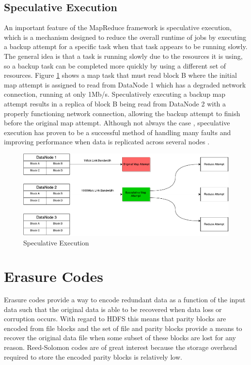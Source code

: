 \documentclass{ucetd}
\begin{document}
    \subsection{Speculative Execution}

An important feature of the MapReduce framework is speculative execution, which
is a mechanism designed to reduce the overall runtime of jobs by executing a
backup attempt for a specific task when that task appears to be running slowly.
The general idea is that a task is running slowly due to the resources it is
using, so a backup task can be completed more quickly by using a different set
of resources.  Figure \ref{specExec} shows a map task that must read block B
where the initial map attempt is assigned to read from DataNode 1 which has a
degraded network connection, running at only 1Mb/s. Speculatively executing a
backup map attempt results in a replica of block B being read from DataNode 2
with a properly functioning network connection, allowing the backup attempt to
finish before the original map attempt. Although
not always the case \cite{Do}, speculative execution has proven to be a
successful method of handling many faults and improving performance when data is
replicated across several nodes \cite{Dean:SpecExec}.

\begin{figure}
    \centering
    \includegraphics[width=\textwidth]{diagrams/SpeculativeExecution.pdf}
    \caption{Speculative Execution}
    \label{specExec}
\end{figure}

\section{Erasure Codes}

Erasure codes provide a way to encode redundant data as a function of the input
data such that the original data is able to be recovered when data loss or
corruption occurs. With regard to HDFS this means that parity blocks are encoded
from file blocks and the set of file and parity blocks provide a means to
recover the original data file when some subset of these blocks are lost for any
reason.  Reed-Solomon codes are of great interest because the storage overhead
required to store the encoded parity blocks is relatively low.
\end{document}
